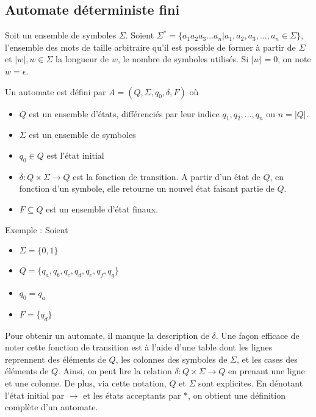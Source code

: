 
	
	
	\subsection{Automate déterministe fini}\label{sub:dfa}
	Soit un ensemble de symboles $\Sigma$. Soient $\Sigma^* = \{ a_1a_2a_3...a_n | a_1,a_2,a_3,...,a_n \in \Sigma \}$, l'ensemble des mots de taille arbitraire qu'il est possible de former à partir de $\Sigma$ et $|w|, w \in \Sigma$ la longueur de $w$, le nombre de symboles utilisés. Si $|w|=0$, on note $w=\epsilon$.
	
	
	Un automate est défini par $A = (Q, \Sigma, q_0, \delta, F)$ où
	\begin{itemize}
		\item $Q$ est un ensemble d'états, différenciés par leur indice $q_1, q_2, ..., q_n$ ou $n = |Q|$.
		\item $\Sigma$ est un ensemble de symboles
		\item $q_0 \in Q$ est l'état initial
		\item $\delta : Q \times \Sigma \rightarrow Q$ est la fonction de transition. A partir d'un état de $Q$, en fonction d'un symbole, elle retourne un nouvel état faisant partie de $Q$.
		\item $F \subseteq Q$ est un ensemble d'état finaux.
	\end{itemize}
	 
	 
	 Exemple :
	 Soient 
	 \begin{itemize}
	 	\item $\Sigma=\{0,1\}$
	 	\item $Q=\{q_a,q_b,q_c,q_d,q_e,q_f,q_g\}$
	 	\item $q_0=q_a$
	 	\item $F=\{q_d\}$
	 \end{itemize}
 	
 	Pour obtenir un automate, il manque la description de $\delta$. Une façon efficace de noter cette fonction de transition est à l'aide d'une table dont les lignes reprennent des éléments de $Q$, les colonnes des symboles de $\Sigma$, et les cases des éléments de $Q$. Ainsi, on peut lire la relation $\delta : Q \times \Sigma \rightarrow Q$ en prenant une ligne et une colonne.
 	De plus, via cette notation, $Q$ et $\Sigma$ sont explicites. En dénotant l'état initial par $\rightarrow$ et les états acceptants par $*$, on obtient une définition complète d'un automate.
 	
